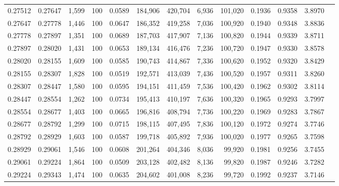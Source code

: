 \begin{tabular}{rrrrrrrrrrrrr}
0.27512 & 0.27647 & 1,599 & 100 &                                     0.0589 & 184,906 & 420,704 &   6,936 & 101,020 & 0.1936 & 0.9358 & 3.8970 \\
0.27647 & 0.27778 & 1,446 & 100 &                                     0.0647 & 186,352 & 419,258 &   7,036 & 100,920 & 0.1940 & 0.9348 & 3.8836 \\
0.27778 & 0.27897 & 1,351 & 100 &                                     0.0689 & 187,703 & 417,907 &   7,136 & 100,820 & 0.1944 & 0.9339 & 3.8711 \\
0.27897 & 0.28020 & 1,431 & 100 &                                     0.0653 & 189,134 & 416,476 &   7,236 & 100,720 & 0.1947 & 0.9330 & 3.8578 \\
0.28020 & 0.28155 & 1,609 & 100 &                                     0.0585 & 190,743 & 414,867 &   7,336 & 100,620 & 0.1952 & 0.9320 & 3.8429 \\
0.28155 & 0.28307 & 1,828 & 100 &                                     0.0519 & 192,571 & 413,039 &   7,436 & 100,520 & 0.1957 & 0.9311 & 3.8260 \\
0.28307 & 0.28447 & 1,580 & 100 &                                     0.0595 & 194,151 & 411,459 &   7,536 & 100,420 & 0.1962 & 0.9302 & 3.8114 \\
0.28447 & 0.28554 & 1,262 & 100 &                                     0.0734 & 195,413 & 410,197 &   7,636 & 100,320 & 0.1965 & 0.9293 & 3.7997 \\
0.28554 & 0.28677 & 1,403 & 100 &                                     0.0665 & 196,816 & 408,794 &   7,736 & 100,220 & 0.1969 & 0.9283 & 3.7867 \\
0.28677 & 0.28792 & 1,299 & 100 &                                     0.0715 & 198,115 & 407,495 &   7,836 & 100,120 & 0.1972 & 0.9274 & 3.7746 \\
0.28792 & 0.28929 & 1,603 & 100 &                                     0.0587 & 199,718 & 405,892 &   7,936 & 100,020 & 0.1977 & 0.9265 & 3.7598 \\
0.28929 & 0.29061 & 1,546 & 100 &                                     0.0608 & 201,264 & 404,346 &   8,036 &  99,920 & 0.1981 & 0.9256 & 3.7455 \\
0.29061 & 0.29224 & 1,864 & 100 &                                     0.0509 & 203,128 & 402,482 &   8,136 &  99,820 & 0.1987 & 0.9246 & 3.7282 \\
0.29224 & 0.29343 & 1,474 & 100 &                                     0.0635 & 204,602 & 401,008 &   8,236 &  99,720 & 0.1992 & 0.9237 & 3.7146 \\

\end{tabular}
